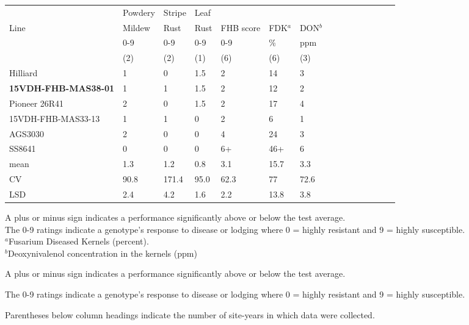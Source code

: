 \documentclass[12pt, letterpaper]{article}
\begin{document}
\begin{landscape}
\begin{table}[ht]
\begin{tabular}{lllllllllllllll}
  \hline
     & Powdery & Stripe & Leaf  &       &     &     \\
Line & Mildew  & Rust   & Rust  & FHB score   & FDK$^a$ & DON$^b$ \\
     & 0-9     & 0-9    & 0-9   & 0-9   & \%  & ppm \\
     & (2)     & (2)    & (1)   & (6)   & (6) & (3) \\
  \hline
  Hilliard           & 1    & 0     & 1.5  & 2    & 14   & 3    \\ 
  \textbf{15VDH-FHB-MAS38-01} & 1    & 1     & 1.5  & 2    & 12   & 2    \\ 
  Pioneer 26R41      & 2    & 0     & 1.5  & 2    & 17   & 4    \\ 
  15VDH-FHB-MAS33-13 & 1    & 1     & 0    & 2    & 6    & 1    \\ 
  AGS3030            & 2    & 0     & 0    & 4    & 24   & 3    \\ 
  SS8641             & 0    & 0     & 0    & 6+   & 46+  & 6    \\ 
  mean               & 1.3  & 1.2   & 0.8  & 3.1  & 15.7 & 3.3  \\ 
  CV                 & 90.8 & 171.4 & 95.0 & 62.3 & 77   & 72.6 \\ 
  LSD                & 2.4  & 4.2   & 1.6  & 2.2  & 13.8 & 3.8  \\
   \hline
\end{tabular}

\raggedright{
\footnotesize
A plus or minus sign indicates a performance significantly above or below the test average.\\
The 0-9 ratings indicate a genotype's response to disease or lodging where 0 = highly resistant and 9 = highly susceptible.\\
$^a$Fusarium Diseased Kernels (percent). \\
$^b$Deoxynivalenol concentration in the kernels (ppm)}
\end{table}

\clearpage

\footnotesize
\begin{ThreePartTable}
\begin{TableNotes}
\footnotesize
\item A plus or minus sign indicates a performance significantly above or below the test average.
\item The 0-9 ratings indicate a genotype's response to disease or lodging where 0 = highly resistant and 9 = highly susceptible.
\item Parentheses below column headings indicate the number of site-years in which data were collected.
\end{TableNotes}


\end{ThreePartTable}
\end{landscape}
\end{document}
